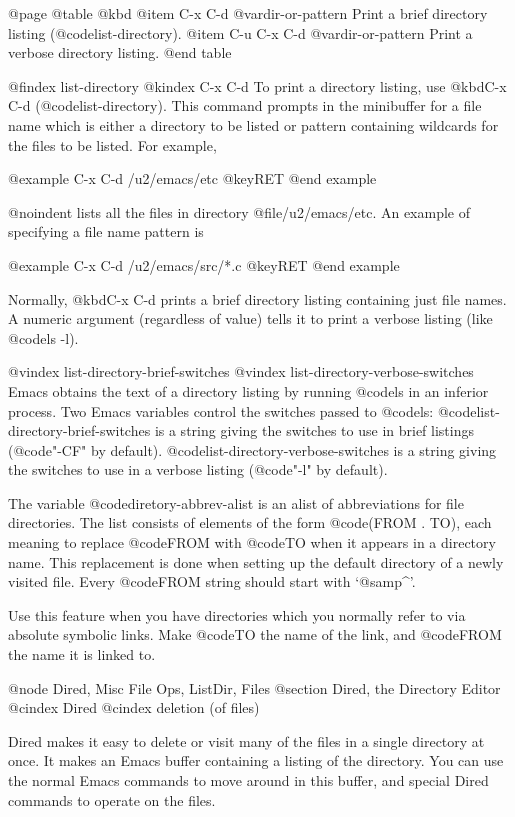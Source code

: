 {{{{{{{{{{{{{{{{{{{@page
@table @kbd
@item C-x C-d @var{dir-or-pattern}
Print a brief directory listing (@code{list-directory}).
@item C-u C-x C-d @var{dir-or-pattern}
Print a verbose directory listing.
@end table

@findex list-directory
@kindex C-x C-d
  To print a directory listing, use @kbd{C-x C-d}
(@code{list-directory}).  This command prompts in the minibuffer for a
file name which is either a  directory to be listed or pattern
containing wildcards for the files to be listed.  For example,

@example
C-x C-d /u2/emacs/etc @key{RET}
@end example

@noindent
lists all the files in directory @file{/u2/emacs/etc}.  An example of
specifying a file name pattern is

@example
C-x C-d /u2/emacs/src/*.c @key{RET}
@end example

  Normally, @kbd{C-x C-d} prints a brief directory listing containing just
file names.  A numeric argument (regardless of value) tells it to print a
verbose listing (like @code{ls -l}).

@vindex list-directory-brief-switches
@vindex list-directory-verbose-switches
  Emacs obtains the text of a directory listing by running @code{ls} in
an inferior process.  Two Emacs variables control the switches passed to
@code{ls}: @code{list-directory-brief-switches} is a string giving the
switches to use in brief listings (@code{"-CF"} by default).
@code{list-directory-verbose-switches} is a string giving the switches
to use in a verbose listing (@code{"-l"} by default).

The variable @code{diretory-abbrev-alist} is an alist of abbreviations
for file directories.  The list consists of elements of the form
@code{(FROM .  TO)}, each meaning to replace @code{FROM} with @code{TO}
when it appears in a directory name.  This replacement is done when
setting up the default directory of a newly visited file.  Every @code{FROM}
string should start with `@samp{^}'.

Use this feature when you have directories which you normally refer to
via absolute symbolic links.  Make @code{TO} the name of the link, and
@code{FROM} the name it is linked to.

@node Dired, Misc File Ops, ListDir, Files
@section Dired, the Directory Editor
@cindex Dired
@cindex deletion (of files)

  Dired makes it easy to delete or visit many of the files in a single
directory at once.  It makes an Emacs buffer containing a listing of the
directory.  You can use the normal Emacs commands to move around in this
buffer, and special Dired commands to operate on the files.

}}}}}}}}}}}}}}}}}}}

